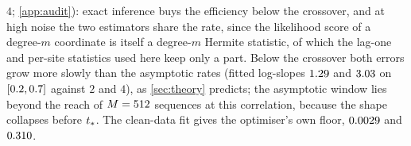 $4$; \cref{app:audit}): exact inference buys the efficiency below the crossover, and at
high noise the two estimators share the rate, since the likelihood score of a degree-$m$
coordinate is itself a degree-$m$ Hermite statistic, of which the lag-one and per-site
statistics used here keep only a part. Below the crossover both errors
grow more slowly than the asymptotic rates (fitted log-slopes $1.29$ and
$3.03$ on $[0.2,0.7]$ against $2$ and $4$), as
\cref{sec:theory} predicts; the asymptotic window lies beyond the reach of
$M=512$ sequences at this correlation, because the shape collapses before
$t_\ast$. The clean-data fit gives the optimiser's own floor, $0.0029$ and
$0.310$.
